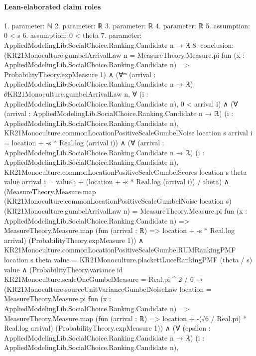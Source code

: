 \documentclass[10pt]{article}
\begin{document}
\paragraph{Lean-elaborated claim roles}\begin{ReviewVerbatim}
1. parameter: ℕ
2. parameter: ℝ
3. parameter: ℝ
4. parameter: ℝ
5. assumption: 0 < s
6. assumption: 0 < theta
7. parameter: AppliedModelingLib.SocialChoice.Ranking.Candidate n → ℝ
8. conclusion: (KR21Monoculture.gumbelArrivalLaw n =
    MeasureTheory.Measure.pi fun (x : AppliedModelingLib.SocialChoice.Ranking.Candidate n) =>
      ProbabilityTheory.expMeasure 1) ∧
  (∀ᵐ (arrival : AppliedModelingLib.SocialChoice.Ranking.Candidate n → ℝ) ∂KR21Monoculture.gumbelArrivalLaw n,
      ∀ (i : AppliedModelingLib.SocialChoice.Ranking.Candidate n), 0 < arrival i) ∧
    (∀ (arrival : AppliedModelingLib.SocialChoice.Ranking.Candidate n → ℝ)
        (i : AppliedModelingLib.SocialChoice.Ranking.Candidate n),
        KR21Monoculture.commonLocationPositiveScaleGumbelNoise location s arrival i =
          location + -s * Real.log (arrival i)) ∧
      (∀ (arrival : AppliedModelingLib.SocialChoice.Ranking.Candidate n → ℝ)
          (i : AppliedModelingLib.SocialChoice.Ranking.Candidate n),
          KR21Monoculture.commonLocationPositiveScaleGumbelScores location s theta value arrival i =
            value i + (location + -s * Real.log (arrival i)) / theta) ∧
        (MeasureTheory.Measure.map (KR21Monoculture.commonLocationPositiveScaleGumbelNoise location s)
              (KR21Monoculture.gumbelArrivalLaw n) =
            MeasureTheory.Measure.pi fun (x : AppliedModelingLib.SocialChoice.Ranking.Candidate n) =>
              MeasureTheory.Measure.map (fun (arrival : ℝ) => location + -s * Real.log arrival)
                (ProbabilityTheory.expMeasure 1)) ∧
          KR21Monoculture.commonLocationPositiveScaleGumbelRUMRankingPMF location s theta value =
              KR21Monoculture.plackettLuceRankingPMF (theta / s) value ∧
            (ProbabilityTheory.variance id KR21Monoculture.scaleOneGumbelMeasure = Real.pi ^ 2 / 6 →
              (KR21Monoculture.sourceUnitVarianceGumbelNoiseLaw location =
                  MeasureTheory.Measure.pi fun (x : AppliedModelingLib.SocialChoice.Ranking.Candidate n) =>
                    MeasureTheory.Measure.map (fun (arrival : ℝ) => location + -(√6 / Real.pi) * Real.log arrival)
                      (ProbabilityTheory.expMeasure 1)) ∧
                (∀ (epsilon : AppliedModelingLib.SocialChoice.Ranking.Candidate n → ℝ)
                    (i : AppliedModelingLib.SocialChoice.Ranking.Candidate n),

\end{ReviewVerbatim}
\end{document}
